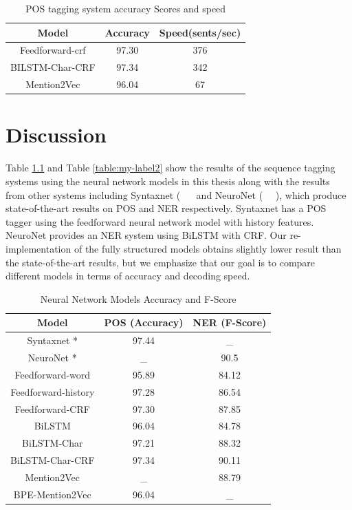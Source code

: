 \documentclass{sfuthesis}
\begin{document}
\begin{table}[]
\centering
\caption{POS tagging system accuracy Scores and speed}
\label{table:pos-mention2vec}
\begin{tabular}{|c|c|c|}
\hline
Model            & Accuracy     & Speed(sents/sec)        \\ \hline
Feedforward-crf  & 97.30  & 376                     \\ \hline
BILSTM-Char-CRF & 97.34  & 342                    \\ \hline
Mention2Vec      & 96.04  & 67                    \\ \hline
\end{tabular}
\end{table}



\chapter{Discussion}

Table \ref{table:my-label1} and Table \ref{table:my-label2} show the results of the sequence tagging systems using the neural network models in this thesis along with the results from other systems including Syntaxnet (~\citeauthor{alberti2017syntaxnet} ~\citeyear{alberti2017syntaxnet} and NeuroNet (~\citeauthor{2017neuroner} ~\citeyear{2017neuroner}), which produce state-of-the-art results on POS and NER respectively. Syntaxnet has a POS tagger using the feedforward neural network model with history features. NeuroNet provides an NER system using BiLSTM with CRF. Our re-implementation of the fully structured models obtains slightly lower result than the state-of-the-art results, but we emphasize that our goal is to compare different models in terms of accuracy and decoding speed.

\begin{table}[]
\centering
\caption{Neural Network Models Accuracy and F-Score}
\label{table:my-label1}
\begin{tabular}{|c|c|c|}
\hline
Model         & POS (Accuracy)  & NER (F-Score)       \\ \hline
Syntaxnet \**    & 97.44         &   _     \\ \hline
NeuroNet \**    & _    & 90.5                \\ \hline 
Feedforward-word    & 95.89          &   84.12     \\ \hline
Feedforward-history & 97.28     & 86.54        \\ \hline
Feedforward-CRF     & 97.30          &   87.85     \\ \hline
BiLSTM  & 96.04     & 84.78                             \\ \hline
BiLSTM-Char & 97.21 & 88.32             \\ \hline
BiLSTM-Char-CRF & 97.34  & 90.11             \\ \hline
Mention2Vec  & _    & 88.79                       \\ \hline
BPE-Mention2Vec & 96.04     &  _   \\ \hline   
\end{tabular}
\end{table}
\end{document}
